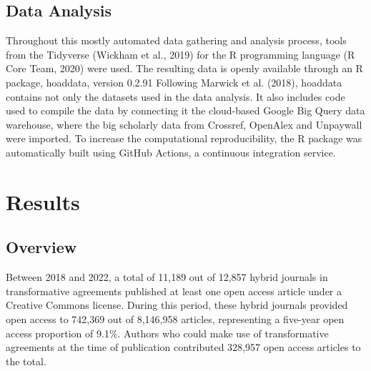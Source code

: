 \documentclass[a4paper,man,floatsintext,longtable,noextraspace,12pt]{apa6}
\begin{document}
\hypertarget{data-analysis}{%
\subsection{Data Analysis}\label{data-analysis}}

Throughout this mostly automated data gathering and analysis process,
tools from the Tidyverse (Wickham et al., 2019) for the R programming
language (R Core Team, 2020) were used. The resulting data is openly
available through an R package, hoaddata, version 0.2.91 Following
Marwick et al. (2018), hoaddata contains not only the datasets used in
the data analysis. It also includes code used to compile the data by
connecting it the cloud-based Google Big Query data warehouse, where the
big scholarly data from Crossref, OpenAlex and Unpaywall were imported.
To increase the computational reproducibility, the R package was
automatically built using GitHub Actions, a continuous integration
service.

\hypertarget{results}{%
\section{Results}\label{results}}

\hypertarget{overview}{%
\subsection{Overview}\label{overview}}

Between 2018 and 2022, a total of 11,189 out of 12,857 hybrid journals
in transformative agreements published at least one open access article
under a Creative Commons license. During this period, these hybrid
journals provided open access to 742,369 out of 8,146,958 articles,
representing a five-year open access proportion of 9.1\%. Authors who
could make use of transformative agreements at the time of publication
contributed 328,957 open access articles to the total.
\end{document}
